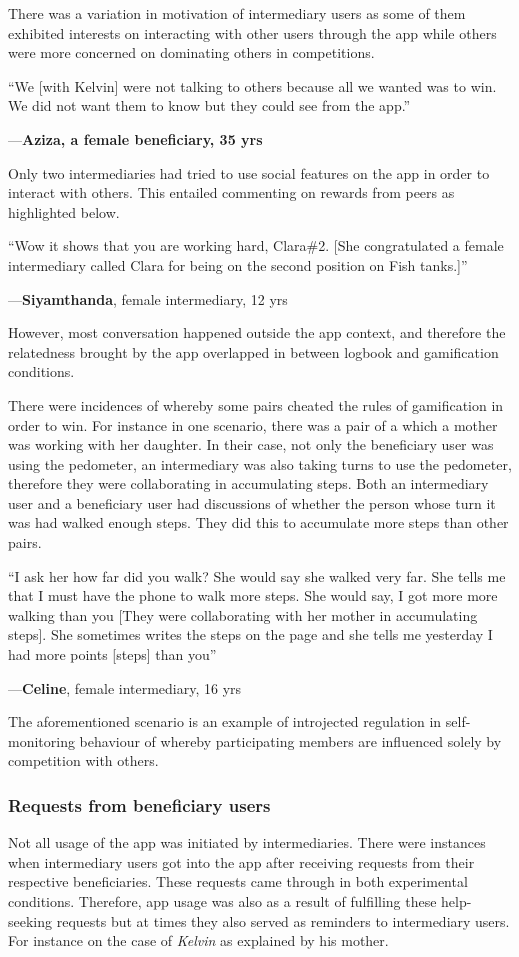 \documentclass{sig-alternate}
\newenvironment{myquote}
               {\list{}{\rightmargin   \leftmargin
                        \parsep        0in }%
                \item\relax}
               {\endlist}
\newcommand{\userquote}[2]{\begin{samepage}\begin{myquote} 
     \em{\small{#2\begin{flushright}---#1\end{flushright}}}
   \end{myquote}\end{samepage}}
\begin{document}
There was a variation in motivation of intermediary users as some of them exhibited interests on interacting with other users through the app while others were more concerned on dominating others in competitions.

\userquote{\textbf{Aziza, a female beneficiary, 35 yrs}} {``We [with Kelvin] were not talking to others because all we wanted was to win. We did not want them to know but they could see from the app.''}
 
Only two intermediaries had tried to use social features on the app in order to interact with others. This entailed commenting on rewards from peers as highlighted below.


\userquote{\textbf{Siyamthanda}, female intermediary, 12 yrs } {``Wow it shows that you are working hard, Clara\#2. [She congratulated a female intermediary called Clara for being on the second position on Fish tanks.]''} 

However, most conversation happened outside the app context, and therefore the relatedness brought by the app overlapped in between logbook and gamification conditions.

There were incidences of whereby some pairs cheated the rules of gamification in order to win. For instance in one scenario, there was a pair of a which a mother was working with her daughter. In their case, not only the beneficiary user was using the pedometer, an intermediary was also taking turns to use the pedometer, therefore they were collaborating in accumulating steps. Both an intermediary user and a beneficiary user had discussions of whether the person whose turn it was had walked enough steps. They did this to accumulate more steps than other pairs.

\userquote{\textbf{Celine}, female intermediary, 16 yrs} {``I ask her how far did you walk?  She would say she walked very far. She tells me that I must have the phone to walk more steps. She would say, I got more more walking than you [They were collaborating with her mother in accumulating steps]. She sometimes writes the steps on the page and she tells me yesterday I had more points [steps] than you''}   

The aforementioned scenario is an example of introjected regulation in self-monitoring behaviour of whereby participating members are influenced solely by competition with others.
\subsubsection*{\textbf{Requests from beneficiary users}}
Not all usage of the app was initiated by intermediaries. There were instances when intermediary users got into the app after receiving requests from their respective beneficiaries. These requests came through in both experimental conditions. Therefore, app usage was also as a result of fulfilling these help-seeking requests but at times they also served as reminders to intermediary users. For instance on the case of \emph{Kelvin} as explained by his mother.
\end{document}
